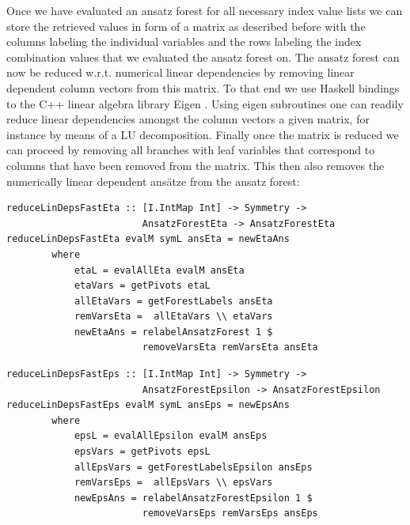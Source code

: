 \documentclass[a4paper,12pt, DIV=14, BCOR=5mm, twoside, headsepline]{scrbook}
\begin{document}
Once we have evaluated an ansatz forest for all necessary index value lists we can store the retrieved values in form of a matrix as described before with the columns labeling the individual variables and the rows labeling the index combination values that we evaluated the ansatz forest on. The ansatz forest can now be reduced w.r.t. numerical linear dependencies by removing linear dependent column vectors from this matrix. To that end we use Haskell bindings \cite{HackageEigen} to the C++ linear algebra library Eigen \cite{eigenweb}. Using eigen subroutines one can readily reduce linear dependencies amongst the column vectors a given matrix, for instance by means of a LU decomposition. Finally once the matrix is reduced we can proceed by removing all branches with leaf variables that correspond to columns that have been removed from the matrix. This then also removes the numerically linear dependent ansätze from the ansatz forest:

\begin{samepage}
\begin{verbatim}
reduceLinDepsFastEta :: [I.IntMap Int] -> Symmetry ->
                        AnsatzForestEta -> AnsatzForestEta
reduceLinDepsFastEta evalM symL ansEta = newEtaAns
        where
            etaL = evalAllEta evalM ansEta
            etaVars = getPivots etaL
            allEtaVars = getForestLabels ansEta
            remVarsEta =  allEtaVars \\ etaVars
            newEtaAns = relabelAnsatzForest 1 $
                        removeVarsEta remVarsEta ansEta
\end{verbatim} 
\end{samepage}

\begin{samepage}
\begin{verbatim}
reduceLinDepsFastEps :: [I.IntMap Int] -> Symmetry ->
                        AnsatzForestEpsilon -> AnsatzForestEpsilon
reduceLinDepsFastEps evalM symL ansEps = newEpsAns
        where
            epsL = evalAllEpsilon evalM ansEps
            epsVars = getPivots epsL
            allEpsVars = getForestLabelsEpsilon ansEps
            remVarsEps =  allEpsVars \\ epsVars
            newEpsAns = relabelAnsatzForestEpsilon 1 $
                        removeVarsEps remVarsEps ansEps 
\end{verbatim} 
\end{samepage}
\end{document}

